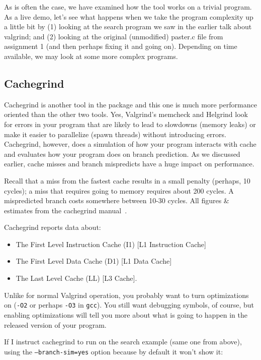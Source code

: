 \documentclass[a4paper]{report}
\begin{document}
As is often the case, we have examined how the tool works on a trivial program. As a live demo, let's see what happens when we take the program complexity up a little bit by (1) looking at the search program we saw in the earlier talk about valgrind; and (2) looking at the original (unmodified) paster.c file from assignment 1 (and then perhaps fixing it and going on). Depending on time available, we may look at some more complex programs.

\subsection*{Cachegrind}

Cachegrind is another tool in the package and this one is much more performance oriented than the other two tools. Yes, Valgrind's memcheck and Helgrind look for errors in your program that are likely to lead to slowdowns (memory leaks) or make it easier to parallelize (spawn threads) without introducing errors. Cachegrind, however, does a simulation of how your program interacts with cache and evaluates how your program does on branch prediction. As we discussed earlier, cache misses and branch mispredicts have a huge impact on performance.

Recall that a miss from the fastest cache results in a small penalty (perhaps, 10 cycles); a miss that requires going to memory requires about 200 cycles. A mispredicted branch costs somewhere between 10-30 cycles. All figures \& estimates from the cachegrind manual~\cite{cachegrind}.

Cachegrind reports data about:
\begin{itemize}
	\item The First Level Instruction Cache (I1) [L1 Instruction Cache]
	\item The First Level Data Cache (D1) [L1 Data Cache]
	\item The Last Level Cache (LL) [L3 Cache].
\end{itemize}

Unlike for normal Valgrind operation, you probably want to turn optimizations on (\texttt{-O2} or perhaps \texttt{-O3} in \texttt{gcc}). You still want debugging symbols, of course, but enabling optimizations will tell you more about what is going to happen in the released version of your program.

If I instruct cachegrind to run on the search example (same one from above), using the \texttt{--branch-sim=yes} option because by default it won't show it:
\end{document}

